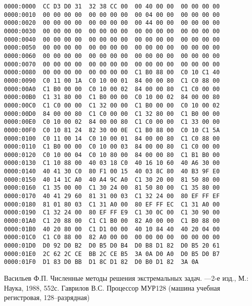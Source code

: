 \documentclass[10pt]{report}
\begin{document}
\begin{verbatim}
0000:0000  CC D3 D0 31  32 38 CC 00  00 40 00 00  00 00 00 00
0000:0010  00 00 00 00  00 00 00 00  00 04 00 00  00 00 00 00
0000:0020  00 00 00 00  00 00 00 00  00 44 00 00  00 00 00 00
0000:0030  00 00 00 00  00 00 00 00  00 00 00 00  00 00 00 00
0000:0040  00 00 00 00  00 00 00 00  00 00 00 00  00 00 00 00
0000:0050  00 00 00 00  00 00 00 00  00 00 00 00  00 00 00 00
0000:0060  00 00 00 00  00 00 00 00  00 00 00 00  00 00 00 00
0000:0070  00 00 00 00  00 00 00 00  00 00 00 00  00 00 00 00
0000:0080  00 00 00 00  00 00 00 00  C1 B0 88 00  C0 10 C1 40
0000:0090  C0 11 00 1A  C0 10 00 01  84 00 00 80  C1 C0 88 00
0000:00A0  C1 B0 00 00  C0 10 00 02  84 00 00 80  C1 C0 00 00
0000:00B0  C1 31 80 00  C1 B0 00 00  C0 10 00 02  84 00 00 80
0000:00C0  C1 C0 00 00  C1 32 00 00  C1 B0 00 00  C0 10 00 02
0000:00D0  84 00 00 80  C1 C0 00 00  C1 32 80 00  C1 B0 00 00
0000:00E0  C0 10 00 02  84 00 00 80  C1 C0 00 00  C1 33 00 00
0000:00F0  C0 10 81 24  82 30 00 0E  C1 B0 88 00  C0 10 C1 5A
0000:0100  C0 11 00 14  C0 10 00 01  84 00 00 80  C1 C0 88 00
0000:0110  C1 B0 00 00  C0 10 00 03  84 00 00 80  C1 C0 00 00
0000:0120  C0 10 00 04  C0 10 80 00  84 00 00 80  C1 B1 B0 00
0000:0130  C1 10 88 00  40 03 18 C0  40 16 10 60  40 A6 30 00
0000:0140  40 41 30 C0  80 F1 00 15  40 03 8C 80  40 B3 9F E0
0000:0150  40 14 1C A0  40 A4 9C A0  C1 30 20 00  81 50 80 00
0000:0160  C1 35 00 00  C1 30 24 00  81 50 80 00  C1 35 80 00
0000:0170  40 41 29 60  81 31 00 03  C1 32 24 00  80 EF FF EF
0000:0180  81 01 80 03  C1 31 A0 00  80 EF FF EC  C1 31 A0 00
0000:0190  C1 32 24 00  80 EF FF E9  C1 30 0C 00  C1 30 90 00
0000:01A0  C1 20 88 00  C1 C1 B0 00  82 A0 00 00  C1 B0 88 00
0000:01B0  40 20 80 00  C1 D1 00 00  40 10 84 40  40 20 04 00
0000:01C0  C1 C0 88 00  82 A0 00 00  00 00 00 00  00 00 00 00
0000:01D0  D0 92 D0 B2  D0 B5 D0 B4  D0 B8 D1 82  D0 B5 20 61
0000:01E0  2C 62 2C CE  BB 2C CE B5  3A 0A D0 A0  D0 B5 D0 B7
0000:01F0  D1 83 D0 BB  D1 8C D1 82  D0 B0 D1 82  3A 0A
\end{verbatim}
    
\renewcommand{\bibname}{Список литературы}
\begin{thebibliography}{99}
 Васильев Ф.П. Численные методы решения экстремальных задач. ---2-е изд., М.: Наука, 1988, 552с.
 Гаврилов В.С. Процессор МУР128 (машина учебная регистровая, 128--разрядная)
\end{thebibliography}    
\end{document}
